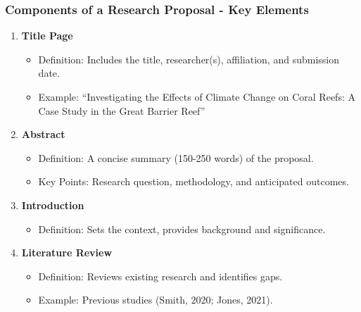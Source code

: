 \documentclass[aspectratio=169]{beamer}
\begin{document}
\begin{frame}[fragile]
    \frametitle{Components of a Research Proposal - Key Elements}
    \begin{enumerate}
        \item \textbf{Title Page}
            \begin{itemize}
                \item Definition: Includes the title, researcher(s), affiliation, and submission date.
                \item Example: ``Investigating the Effects of Climate Change on Coral Reefs: A Case Study in the Great Barrier Reef''
            \end{itemize}
        \item \textbf{Abstract}
            \begin{itemize}
                \item Definition: A concise summary (150-250 words) of the proposal.
                \item Key Points: Research question, methodology, and anticipated outcomes.
            \end{itemize}
        \item \textbf{Introduction}
            \begin{itemize}
                \item Definition: Sets the context, provides background and significance.
            \end{itemize}
        \item \textbf{Literature Review}
            \begin{itemize}
                \item Definition: Reviews existing research and identifies gaps.
                \item Example: Previous studies (Smith, 2020; Jones, 2021).
            \end{itemize}
    \end{enumerate}
\end{frame}
\end{document}
